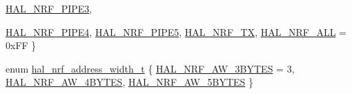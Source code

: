 \begin{DoxyCompactItemize}
\hyperlink{group__nordic__hal__nrf__reg_gga321d8cfbce9e410a49afac1f04cc2457a14f59c552adf1f7a91db52bb8d19bfab}{HAL\_\-NRF\_\-PIPE3}, 
\par
\hyperlink{group__nordic__hal__nrf__reg_gga321d8cfbce9e410a49afac1f04cc2457a2beff936c19285d52e99ea13b1e1fd00}{HAL\_\-NRF\_\-PIPE4}, 
\hyperlink{group__nordic__hal__nrf__reg_gga321d8cfbce9e410a49afac1f04cc2457a8d5b68ebf5dd5ee73e6904b482721810}{HAL\_\-NRF\_\-PIPE5}, 
\hyperlink{group__nordic__hal__nrf__reg_gga321d8cfbce9e410a49afac1f04cc2457ad80231cd7604958d83ebd1ffd9d38d0c}{HAL\_\-NRF\_\-TX}, 
\hyperlink{group__nordic__hal__nrf__reg_gga321d8cfbce9e410a49afac1f04cc2457adb4ce66b5609fc0df7e3b53d3b55fd8e}{HAL\_\-NRF\_\-ALL} =  0xFF
 \}
\item 
enum \hyperlink{group__nordic__hal__nrf__reg_ga9f42a9a295b0802dd10d7f23c3526832}{hal\_\-nrf\_\-address\_\-width\_\-t} \{ \hyperlink{group__nordic__hal__nrf__reg_gga9f42a9a295b0802dd10d7f23c3526832a7d7a5af6b099215e0143a79b22c784c3}{HAL\_\-NRF\_\-AW\_\-3BYTES} =  3, 
\hyperlink{group__nordic__hal__nrf__reg_gga9f42a9a295b0802dd10d7f23c3526832ace672bf3d671125616b31526a22da284}{HAL\_\-NRF\_\-AW\_\-4BYTES}, 
\hyperlink{group__nordic__hal__nrf__reg_gga9f42a9a295b0802dd10d7f23c3526832ae3c0a8956cfc5fb3b5a435c3961c8dad}{HAL\_\-NRF\_\-AW\_\-5BYTES}
 \}
\end{DoxyCompactItemize}
